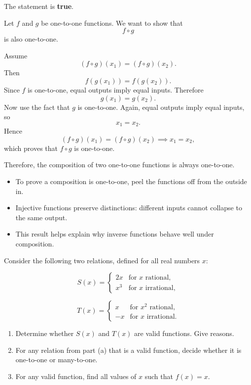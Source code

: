 \begin{solution}
The statement is \textbf{true}.

Let $f$ and $g$ be one-to-one functions. We want to show that
\[
f\circ g
\]
is also one-to-one.

Assume
\[
(f\circ g)(x_1)=(f\circ g)(x_2).
\]
Then
\[
f(g(x_1))=f(g(x_2)).
\]
Since $f$ is one-to-one, equal outputs imply equal inputs. Therefore
\[
g(x_1)=g(x_2).
\]
Now use the fact that $g$ is one-to-one. Again, equal outputs imply equal inputs, so
\[
x_1=x_2.
\]
Hence
\[
(f\circ g)(x_1)=(f\circ g)(x_2)\implies x_1=x_2,
\]
which proves that $f\circ g$ is one-to-one.

Therefore, the composition of two one-to-one functions is always one-to-one.
\end{solution}

\begin{takeaways}
\begin{itemize}[leftmargin=*]
\item To prove a composition is one-to-one, peel the functions off from the outside in.
\item Injective functions preserve distinctions: different inputs cannot collapse to the same output.
\item This result helps explain why inverse functions behave well under composition.
\end{itemize}
\end{takeaways}

\begin{problem}
Consider the following two relations, defined for all real numbers $x$:

\[
S(x)=
\begin{cases}
2x & \text{for } x \text{ rational},\\
x^3 & \text{for } x \text{ irrational},
\end{cases}
\]

\[
T(x)=
\begin{cases}
x & \text{for } x^2 \text{ rational},\\
-x & \text{for } x \text{ irrational}.
\end{cases}
\]

\begin{enumerate}[label=(\alph*)]
\item Determine whether $S(x)$ and $T(x)$ are valid functions. Give reasons.
\item For any relation from part (a) that is a valid function, decide whether it is one-to-one or many-to-one.
\item For any valid function, find all values of $x$ such that $f(x)=x$.
\end{enumerate}
\end{problem}

